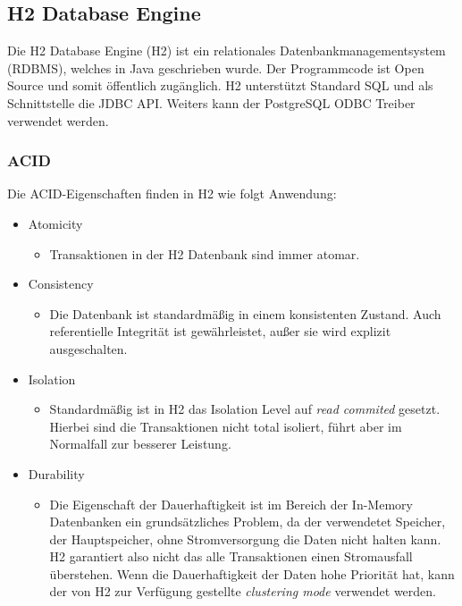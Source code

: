 \documentclass[draft,final]{vutinfth} %
\begin{document}
\subsection{H2 Database Engine}

Die H2 Database Engine (H2) ist ein relationales Datenbankmanagementsystem (RDBMS), welches in Java geschrieben wurde. Der Programmcode ist Open Source und somit öffentlich zugänglich. H2 unterstützt Standard SQL und als Schnittstelle die JDBC API. Weiters kann der PostgreSQL ODBC Treiber verwendet werden.

\subsubsection*{ACID}
Die ACID-Eigenschaften finden in H2 wie folgt Anwendung:
\begin{itemize}
	\item Atomicity
	\begin{itemize}
		\item Transaktionen in der H2 Datenbank sind immer atomar.
	\end{itemize}
	\item Consistency
	\begin{itemize}
		\item Die Datenbank ist standardmä{\ss}ig in einem konsistenten Zustand. Auch referentielle Integrität ist gewährleistet, au\ss er sie wird explizit ausgeschalten.
	\end{itemize}
	\item Isolation
	\begin{itemize}
		\item Standardmä{\ss}ig ist in H2 das Isolation Level auf \textit{read commited} gesetzt. Hierbei sind die Transaktionen nicht total isoliert, führt aber im Normalfall zur besserer Leistung.
	\end{itemize}
	\item Durability
	\begin{itemize}
		\item Die Eigenschaft der Dauerhaftigkeit ist im Bereich der In-Memory Datenbanken ein grundsätzliches Problem, da der verwendetet Speicher, der Hauptspeicher, ohne Stromversorgung die Daten nicht halten kann. H2 garantiert also nicht das alle Transaktionen einen Stromausfall überstehen. Wenn die Dauerhaftigkeit der Daten hohe Priorität hat, kann der von H2 zur Verfügung gestellte \textit{clustering mode} verwendet werden. 
	\end{itemize}
\end{itemize}
\end{document}

